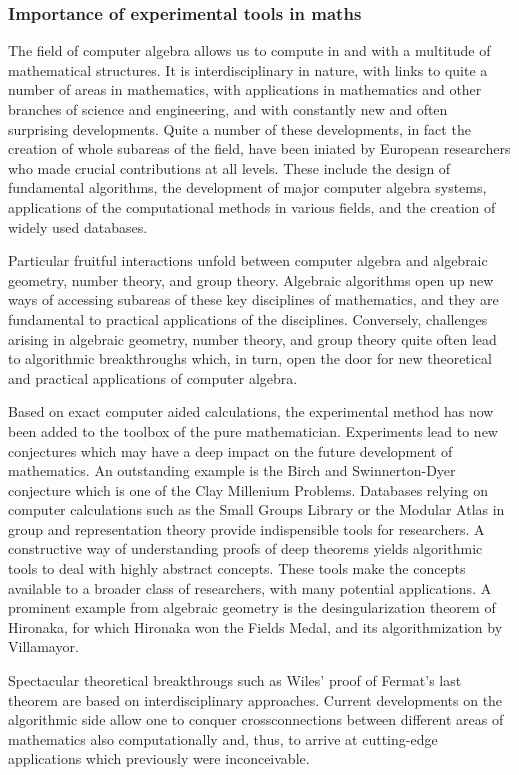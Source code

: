 \documentclass[a4paper,11pt]{article}
\begin{document}
\subsubsection{Importance of experimental tools in maths}

The field of computer algebra allows us to compute in and with a multitude
of mathematical structures. It is interdisciplinary in nature, with links to quite
a number of areas in mathematics, with applications in mathematics and other
branches of science and engineering, and with constantly new and often
surprising developments. Quite a number of these developments, in fact the
creation of whole subareas of the field,  have been iniated by European
researchers who made crucial contributions at all levels. These include the
design of fundamental algorithms, the development of major computer
algebra systems, applications of the computational methods in various fields,
and the creation of widely used databases.

Particular fruitful interactions unfold between computer algebra and
algebraic geometry, number theory, and group theory. Algebraic algorithms
open up new ways of accessing subareas of these key disciplines of
mathematics, and they are fundamental to practical applications of the
disciplines. Conversely, challenges arising in algebraic geometry, number
theory, and group theory quite often lead to algorithmic breakthroughs
which, in turn, open the door for new theoretical and practical applications
of computer algebra.

Based on exact computer aided calculations, the experimental method has
now been added to the toolbox of the pure mathematician. Experiments
lead to new conjectures which may have a deep impact on the future
development of mathematics. An outstanding example is the Birch and
Swinnerton-Dyer conjecture which is one of the Clay Millenium Problems.
Databases relying on computer calculations such as the Small Groups
Library or the Modular Atlas in group and representation theory provide
indispensible tools for researchers. A constructive way of understanding
proofs of deep theorems yields algorithmic tools to deal with highly abstract
concepts. These tools make the concepts available to a broader class of
researchers, with many potential applications. A prominent example from
algebraic geometry is the desingularization theorem of Hironaka, for which
Hironaka won the Fields Medal, and its algorithmization by Villamayor.

Spectacular theoretical breakthrougs such as Wiles' proof of Fermat's last
theorem are based on interdisciplinary approaches. Current developments
on the algorithmic side allow one to conquer crossconnections between
different areas of mathematics also computationally and, thus, to
arrive at cutting-edge applications which previously were inconceivable.
\end{document}
